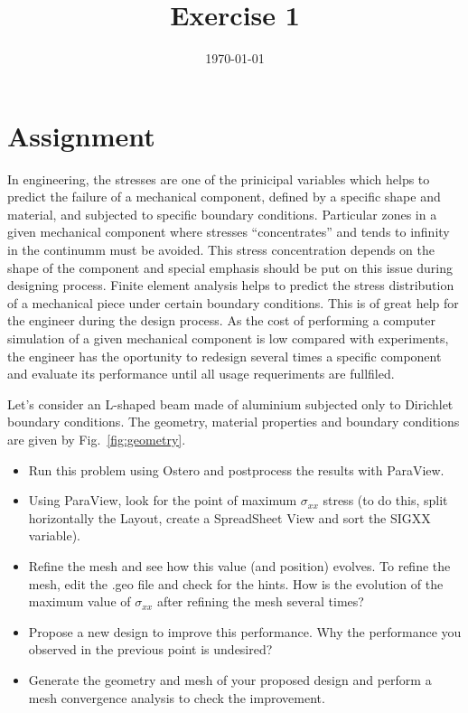 \documentclass[12pt]{article}
\title{Exercise 1}
\date{\today}
\begin{document}
\maketitle

\section{Assignment}
In engineering, the stresses are one of the prinicipal variables which helps to predict the failure of a mechanical component, defined by a specific shape and material, and subjected to specific boundary conditions. Particular zones in a given mechanical component where stresses ``concentrates'' and tends to infinity in the continumm must be avoided. This stress concentration depends on the shape of the component and special emphasis should be put on this issue during designing process. Finite element analysis helps to predict the stress distribution of a mechanical piece under certain boundary conditions. This is of great help for the engineer during the design process. As the cost of performing a computer simulation of a given mechanical component is low compared with experiments, the engineer has the oportunity to redesign several times a specific component and evaluate its performance until all usage requeriments are fullfiled. 

\medskip

Let's consider an L-shaped beam made of aluminium subjected only to Dirichlet boundary conditions. The geometry, material properties and boundary conditions are given by Fig.~\ref{fig:geometry}.
\begin{itemize}
\item Run this problem using Ostero and postprocess the results with ParaView. 
\item Using ParaView, look for the point of maximum $\sigma_{xx}$ stress (to do this, split horizontally the Layout, create a SpreadSheet View and sort the SIGXX variable).
\item Refine the mesh and see how this value (and position) evolves. To refine the mesh, edit the .geo file and check for the hints. How is the evolution of the maximum value of $\sigma_{xx}$ after refining the mesh several times?
\item Propose a new design to improve this performance. Why the performance you observed in the previous point is undesired?
\item Generate the geometry and mesh of your proposed design and perform a mesh convergence analysis to check the improvement.
\end{itemize}
\end{document}
